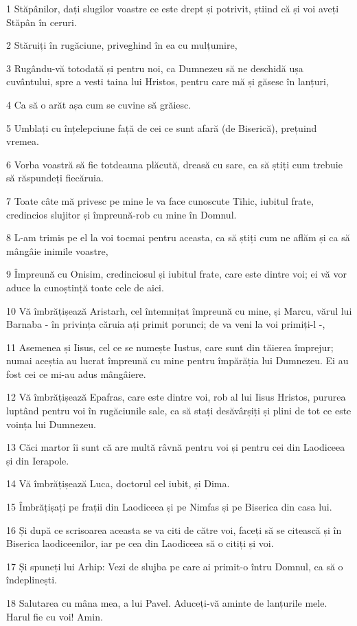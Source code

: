 \par 1 Stăpânilor, dați slugilor voastre ce este drept și potrivit, știind că și voi aveți Stăpân în ceruri.
\par 2 Stăruiți în rugăciune, priveghind în ea cu mulțumire,
\par 3 Rugându-vă totodată și pentru noi, ca Dumnezeu să ne deschidă ușa cuvântului, spre a vesti taina lui Hristos, pentru care mă și găsesc în lanțuri,
\par 4 Ca să o arăt așa cum se cuvine să grăiesc.
\par 5 Umblați cu înțelepciune față de cei ce sunt afară (de Biserică), prețuind vremea.
\par 6 Vorba voastră să fie totdeauna plăcută, dreasă cu sare, ca să știți cum trebuie să răspundeți fiecăruia.
\par 7 Toate câte mă privesc pe mine le va face cunoscute Tihic, iubitul frate, credincios slujitor și împreună-rob cu mine în Domnul.
\par 8 L-am trimis pe el la voi tocmai pentru aceasta, ca să știți cum ne aflăm și ca să mângâie inimile voastre,
\par 9 Împreună cu Onisim, credinciosul și iubitul frate, care este dintre voi; ei vă vor aduce la cunoștință toate cele de aici.
\par 10 Vă îmbrățișează Aristarh, cel întemnițat împreună cu mine, și Marcu, vărul lui Barnaba - în privința căruia ați primit porunci; de va veni la voi primiți-l -,
\par 11 Asemenea și Iisus, cel ce se numește Iustus, care sunt din tăierea împrejur; numai aceștia au lucrat împreună cu mine pentru împărăția lui Dumnezeu. Ei au fost cei ce mi-au adus mângâiere.
\par 12 Vă îmbrățișează Epafras, care este dintre voi, rob al lui Iisus Hristos, pururea luptând pentru voi în rugăciunile sale, ca să stați desăvârșiți și plini de tot ce este voința lui Dumnezeu.
\par 13 Căci martor îi sunt că are multă râvnă pentru voi și pentru cei din Laodiceea și din Ierapole.
\par 14 Vă îmbrățișează Luca, doctorul cel iubit, și Dima.
\par 15 Îmbrățișați pe frații din Laodiceea și pe Nimfas și pe Biserica din casa lui.
\par 16 Și după ce scrisoarea aceasta se va citi de către voi, faceți să se citească și în Biserica laodiceenilor, iar pe cea din Laodiceea să o citiți și voi.
\par 17 Și spuneți lui Arhip: Vezi de slujba pe care ai primit-o întru Domnul, ca să o îndeplinești.
\par 18 Salutarea cu mâna mea, a lui Pavel. Aduceți-vă aminte de lanțurile mele. Harul fie cu voi! Amin.


